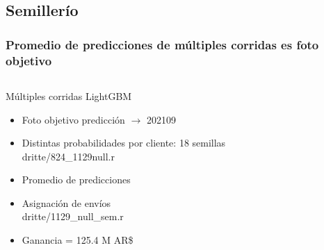 \documentclass[aspectratio=169]{beamer} %
\begin{document}
\subsection{Semillerío}

\begin{frame}
  \frametitle{Promedio de predicciones de múltiples corridas es foto objetivo}
  \begin{columns}[onlytextwidth]
    \begin{column}{.6\textwidth}
      \begin{block}{Múltiples corridas LightGBM}
        \begin{itemize}
          \item Foto objetivo predicción $\rightarrow$ 202109
          \item Distintas probabilidades por cliente: 18 semillas\\
          {\tiny dritte/824\_1129null.r}
          \item Promedio de predicciones\\
          \item Asignación de envíos\\
          {\tiny dritte/1129\_null\_sem.r}
			    \item Ganancia = 125.4 M AR\$
        \end{itemize}
      \end{block}
    \end{column}
  \end{columns}      
\end{frame}
\end{document}
